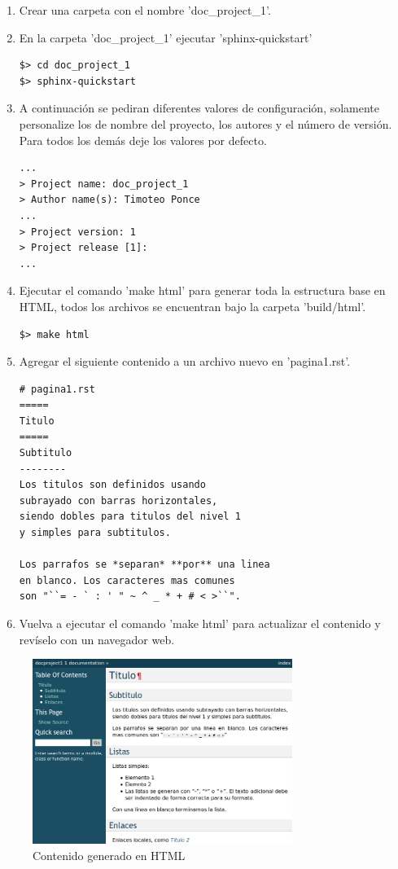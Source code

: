 \documentclass{sig-alternate}
\begin{document}
		\begin{enumerate}
			\item Crear una carpeta con el nombre 'doc\_project\_1'.
			\item En la carpeta 'doc\_project\_1' ejecutar 'sphinx-quickstart'
			
\begin{lstlisting}
$> cd doc_project_1
$> sphinx-quickstart
\end{lstlisting}

			\item A continuaci\'on se pediran diferentes valores de configuraci\'on, 
				solamente personalize los de nombre del proyecto, los autores y 
				el n\'umero de versi\'on. Para 
				todos los dem\'as deje los valores por defecto.
\begin{lstlisting}
... 
> Project name: doc_project_1
> Author name(s): Timoteo Ponce
...
> Project version: 1
> Project release [1]: 
...
\end{lstlisting}

			\item Ejecutar el comando 'make html' para generar toda la estructura 
				base en HTML, todos los archivos se encuentran bajo la carpeta 
				'build/html'.
			
\begin{lstlisting}
$> make html
\end{lstlisting}

			\item Agregar el siguiente contenido a un archivo nuevo en 'pagina1.rst'.
			
\begin{lstlisting}
# pagina1.rst
===== 
Titulo 
===== 
Subtitulo 
-------- 
Los titulos son definidos usando 
subrayado con barras horizontales, 
siendo dobles para titulos del nivel 1
y simples para subtitulos.
	
Los parrafos se *separan* **por** una linea 
en blanco. Los caracteres mas comunes 
son "``= - ` : ' " ~ ^ _ * + # < >``". 	
\end{lstlisting}
			\item Vuelva a ejecutar el comando 'make html' para actualizar el contenido
				y rev\'iselo con un navegador web.
		\end{enumerate}

	\begin{figure}[!htbp]
	  \centerline{\includegraphics[height=6cm]{rest_1.png}}
	\caption{Contenido generado en HTML}
	\end{figure}
\end{document}
